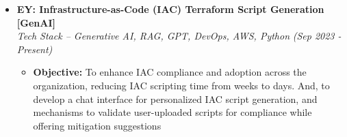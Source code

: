 \documentclass[a4paper,10pt]{article}
\newcommand{\isep}{-2 pt}
\begin{document}
\begin{itemize}
\item \textbf{EY: Infrastructure-as-Code (IAC) Terraform Script Generation [GenAI]}  \\
    \emph{Tech Stack -- Generative AI, RAG, GPT, DevOps, AWS, Python} \hfill {\emph{(Sep 2023 - Present)}}
    \\[-0.6cm]
    \begin{itemize}\itemsep \isep
    \item \textbf{Objective:} To enhance IAC compliance and adoption across the organization, reducing IAC scripting time from weeks to days. And, to develop a chat interface for personalized IAC script generation, and mechanisms to validate user-uploaded scripts for compliance while offering mitigation suggestions


\end{itemize}
\end{itemize}
\end{document}
